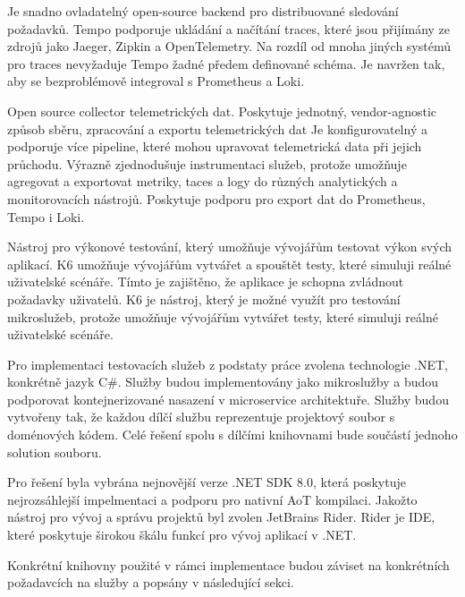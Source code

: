 
Je snadno ovladatelný open-source backend pro distribuované sledování požadavků. Tempo podporuje ukládání a načítání traces, které jsou přijímány ze zdrojů jako Jaeger, Zipkin a OpenTelemetry. Na rozdíl od mnoha jiných systémů pro traces nevyžaduje Tempo žadné předem definované schéma. Je navržen tak, aby se bezproblémově integroval s Prometheus a Loki.


Open source collector telemetrických dat. Poskytuje jednotný, vendor-agnostic způsob sběru, zpracování a exportu telemetrických dat  Je konfigurovatelný a podporuje více pipeline, které mohou upravovat telemetrická data při jejich průchodu. Výrazně zjednodušuje instrumentaci služeb, protože umožňuje agregovat a exportovat metriky, taces a logy do různých analytických a monitorovacích nástrojů. Poskytuje podporu pro export dat do Prometheus, Tempo i Loki.



Nástroj pro výkonové testování, který umožňuje vývojářům testovat výkon svých aplikací. K6 umožňuje vývojářům vytvářet a spouštět testy, které simuluji reálné uživatelské scénáře. Tímto je zajištěno, že aplikace je schopna zvládnout požadavky uživatelů. K6 je nástroj, který je možné využít pro testování mikroslužeb, protože umožňuje vývojářům vytvářet testy, které simuluji reálné uživatelské scénáře.


Pro implementaci testovacích služeb z podstaty práce zvolena technologie .NET, konkrétně jazyk C\#. Služby budou implementovány jako mikroslužby a budou podporovat kontejnerizované nasazení v microservice architektuře. Služby budou vytvořeny tak, že každou dílčí službu reprezentuje projektový soubor s doménových kódem. Celé řešení spolu s dílčími knihovnami bude součástí jednoho solution souboru.

Pro řešení byla vybrána nejnovější verze .NET SDK 8.0, která poskytuje nejrozsáhlejší impelmentaci a podporu pro nativní AoT kompilaci. Jakožto nástroj pro vývoj a správu projektů byl zvolen JetBrains Rider. Rider je IDE, které poskytuje širokou škálu funkcí pro vývoj aplikací v .NET.

Konkrétní knihovny použité v rámci implementace budou záviset na konkrétních požadavcích na služby a popsány v následující sekci.


